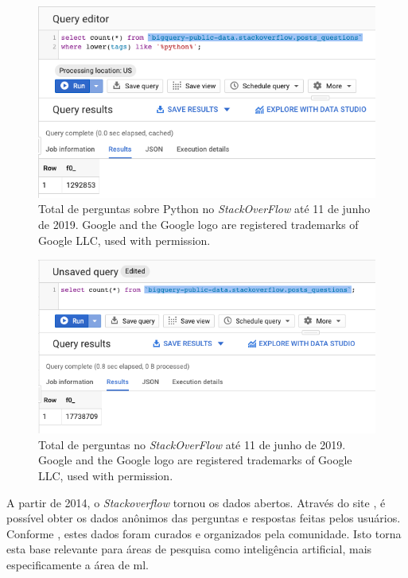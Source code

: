 \begin{figure}[h]
\includegraphics[width=12cm]{src/figuras/cap-introducao/number-python-questions-sof.png}
\caption{Total de perguntas sobre Python no \textit{StackOverFlow} até 11 de junho de 2019. Google and the Google logo are registered trademarks of Google LLC, used with permission.}
\label{fig:bigquery-total-questions-python-stackoverflow}
\end{figure}

\begin{figure}[h]
\includegraphics[width=12cm]{src/figuras/cap-introducao/number-questions-sof.png}
\caption{Total de perguntas no \textit{StackOverFlow} até 11 de junho de 2019. Google and the Google logo are registered trademarks of Google LLC, used with permission.}
\label{fig:bigquery-total-questions-stackoverflow}
\end{figure}

A partir de 2014, o \textit{Stackoverflow} tornou os dados abertos. Através do site \cite{sof-2019}, é possível obter os dados anônimos das perguntas e respostas feitas pelos usuários. Conforme \cite{Wang-quora:2013}, estes dados foram curados e organizados pela comunidade. Isto torna esta base relevante para áreas de pesquisa como inteligência artificial, mais especificamente a área de \gls{ml}. 







